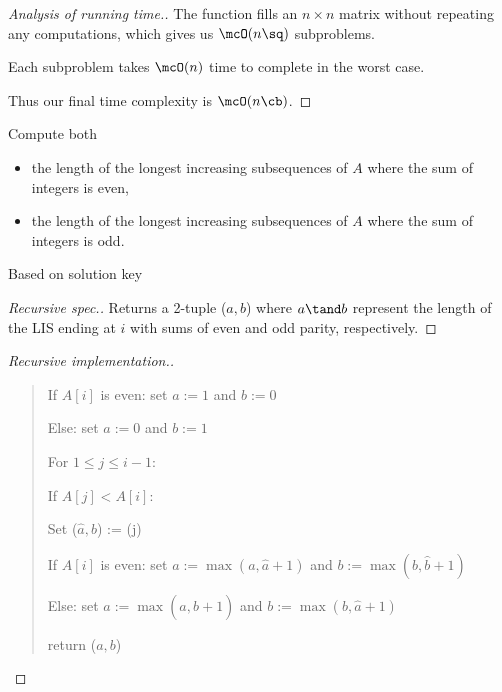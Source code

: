 \documentclass{article}
\begin{document}
\begin{proof}[Analysis of running time.]
  The function  fills an \( n\times n \) matrix without repeating any computations, which gives us \( \mcO(n\sq) \) subproblems.

  Each subproblem takes \( \mcO(n) \) time to complete in the worst case.

  Thus our final time complexity is \( \mcO(n\cb) \).
\end{proof}
\pagebreak

\setcounter{subexercise}{3}
\begin{subexercise}
Compute both \begin{itemize}
\item the length of the longest increasing subsequences of \( A \) where the sum of integers is even,
\item the length of the longest increasing subsequences of \( A \) where the sum of integers is odd.
\end{itemize}
\end{subexercise}

\begin{note}
  Based on solution key
\end{note}

\begin{proof}[Recursive spec.]
Returns a 2-tuple (\( a,b \)) where \( a\tand b \) represent the length of the LIS ending at \( i \) with sums of even and odd parity, respectively.
\end{proof}

\begin{proof}[Recursive implementation.]\
  \begin{quote}
  \begin{steps}
    \item If \( A[i] \) is even: set \( a := 1 \) and \( b := 0 \)
    \item Else: set \( a := 0 \) and \( b := 1 \)
    \item For \( 1 \leq j \leq i-1 \): \begin{steps}
      \item If \( A[j] < A[i] \): \begin{steps}
        \item Set (\( \hat a, \hat b \)) := (j)
        \item If \( A[i] \) is even: set \( a := \max(a,\hat a + 1) \) and \( b := \max(b,\hat b+1) \)
        \item Else: set \( a := \max(a,\hat b + 1) \) and \( b := \max(b,\hat a + 1) \)
      \end{steps}
    \end{steps}
    \item return (\( a,b \))
  \end{steps}
  \end{quote}
\end{proof}
\end{document}

